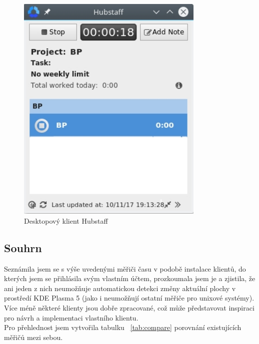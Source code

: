 \documentclass[thesis=B,czech]{FITthesis}[2012/06/26]
\begin{document}
\begin{figure}[h]\centering
	\includegraphics[width=0.8\textwidth]{hubstaff.jpg}
	\caption[Desktopový klient Hubstaff]{Desktopový klient Hubstaff}\label{fig:hubstaff}
\end{figure}

\newpage
\subsection{Souhrn}
Seznámila jsem se s výše uvedenými měřiči času v podobě instalace klientů, do kterých jsem se přihlásila svým vlastním účtem, prozkoumala jsem je a zjistila, že ani jeden z nich neumožňuje automatickou detekci změny aktuální plochy v prostředí KDE Plasma 5 (jako i neumožňují ostatní měřiče pro unixové systémy). Více méně některé klienty jsou dobře zpracované, což může představovat inspiraci pro návrh a implementaci vlastního klientu. \\
Pro přehlednost jsem vytvořila tabulku ~\ref{tab:compare} porovnání existujících měřičů mezi sebou.
\end{document}
